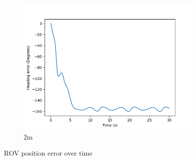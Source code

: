 \documentclass[class=article, crop=false]{standalone}
\begin{document}
\begin{figure}
\begin{subfigure}[b]{0.48\textwidth}
        \includegraphics{scenario1/rov-50m/2.0m/usv_heading_error_uncontrolled}
        \caption{2m}
        \label{}
    \end{subfigure}

    \caption{ROV position error over time}
\end{figure}
\end{document}
